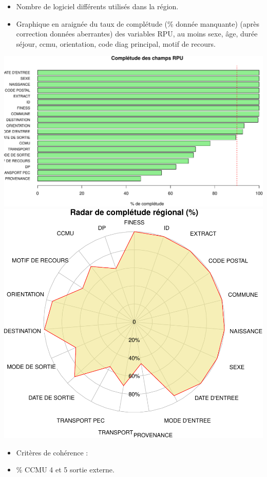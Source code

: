 \documentclass[]{article}
\begin{document}
\begin{itemize}
\item
  Nombre de logiciel différents utilisés dans la région.
\item
  Graphique en araignée du taux de complétude (\% donnée manquante)
  (après correction données aberrantes) des variables RPU, au moins
  sexe, âge, durée séjour, ccmu, orientation, code diag principal, motif
  de recours.
\end{itemize}

\includegraphics{rapport_2014_files/figure-latex/completude-1.pdf}
\includegraphics{rapport_2014_files/figure-latex/completude-2.pdf}

\begin{itemize}
\item
  Critères de cohérence :
\item
  \% CCMU 4 et 5 sortie externe.
\end{itemize}
\end{document}
